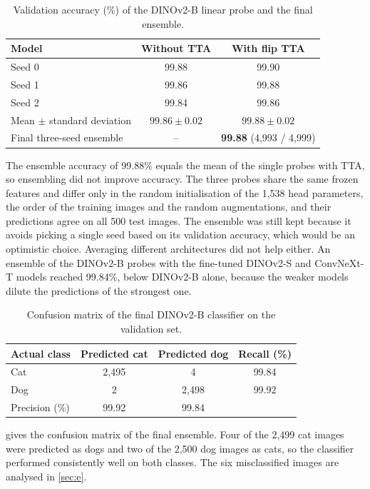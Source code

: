 \documentclass[11pt,a4paper]{article}
\newcommand{\pct}[1]{#1\%}
\begin{document}
\begin{table}[ht]
  \centering
  \small
  \caption{Validation accuracy (\%) of the DINOv2-B linear probe and the final ensemble.}
  \label{tab:seeds}
  \begin{tabular}{@{}lcc@{}}
    \toprule
    Model & Without TTA & With flip TTA \\
    \midrule
    Seed 0 & 99.88 & 99.90 \\
    Seed 1 & 99.86 & 99.88 \\
    Seed 2 & 99.84 & 99.86 \\
    Mean $\pm$ standard deviation & $99.86 \pm 0.02$ & $99.88 \pm 0.02$ \\
    \midrule
    Final three-seed ensemble & -- & \textbf{99.88} (4,993 / 4,999) \\
    \bottomrule
  \end{tabular}
\end{table}

The ensemble accuracy of \pct{99.88} equals the mean of the single probes with TTA, so ensembling did not improve accuracy. The three probes share the same frozen features and differ only in the random initialisation of the 1,538 head parameters, the order of the training images and the random augmentations, and their predictions agree on all 500 test images. The ensemble was still kept because it avoids picking a single seed based on its validation accuracy, which would be an optimistic choice. Averaging different architectures did not help either. An ensemble of the DINOv2-B probes with the fine-tuned DINOv2-S and ConvNeXt-T models reached \pct{99.84}, below DINOv2-B alone, because the weaker models dilute the predictions of the strongest one.

\begin{table}[ht]
  \centering
  \small
  \caption{Confusion matrix of the final DINOv2-B classifier on the validation set.}
  \label{tab:confusion}
  \begin{tabular}{@{}lccc@{}}
    \toprule
    Actual class & Predicted cat & Predicted dog & Recall (\%) \\
    \midrule
    Cat & 2,495 & 4     & 99.84 \\
    Dog & 2     & 2,498 & 99.92 \\
    \midrule
    Precision (\%) & 99.92 & 99.84 & \\
    \bottomrule
  \end{tabular}
\end{table}

 gives the confusion matrix of the final ensemble. Four of the 2,499 cat images were predicted as dogs and two of the 2,500 dog images as cats, so the classifier performed consistently well on both classes. The six misclassified images are analysed in \cref{sec:e}.
\end{document}
